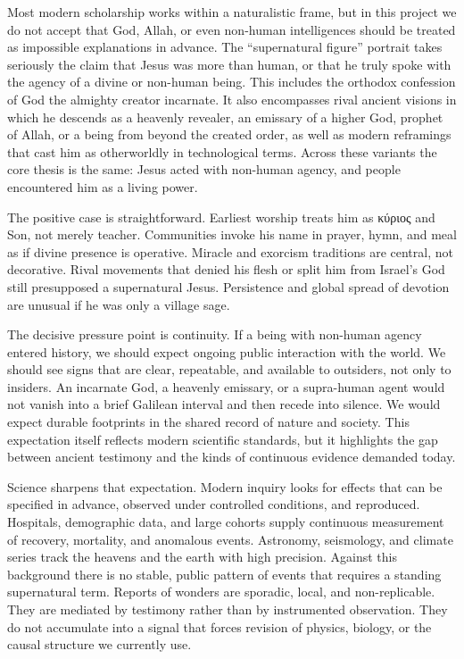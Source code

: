 Most modern scholarship works within a naturalistic frame, but in this project we do not accept that God, Allah, or even non-human intelligences should be treated as impossible explanations in advance.
The ``supernatural figure'' portrait takes seriously the claim that Jesus was more than human, or that he truly spoke with the agency of a divine or non-human being.
This includes the orthodox confession of God the almighty creator incarnate.
It also encompasses rival ancient visions in which he descends as a heavenly revealer, an emissary of a higher God, prophet of Allah, or a being from beyond the created order, as well as modern reframings that cast him as otherworldly in technological terms.
Across these variants the core thesis is the same: Jesus acted with non-human agency, and people encountered him as a living power.

The positive case is straightforward.
Earliest worship treats him as κύριος and Son, not merely teacher.
Communities invoke his name in prayer, hymn, and meal as if divine presence is operative.
Miracle and exorcism traditions are central, not decorative.
Rival movements that denied his flesh or split him from Israel’s God still presupposed a supernatural Jesus.
Persistence and global spread of devotion are unusual if he was only a village sage.

The decisive pressure point is continuity.
If a being with non-human agency entered history, we should expect ongoing public interaction with the world.
We should see signs that are clear, repeatable, and available to outsiders, not only to insiders.
An incarnate God, a heavenly emissary, or a supra-human agent would not vanish into a brief Galilean interval and then recede into silence.
We would expect durable footprints in the shared record of nature and society.
This expectation itself reflects modern scientific standards, but it highlights the gap between ancient testimony and the kinds of continuous evidence demanded today.

Science sharpens that expectation.
Modern inquiry looks for effects that can be specified in advance, observed under controlled conditions, and reproduced.
Hospitals, demographic data, and large cohorts supply continuous measurement of recovery, mortality, and anomalous events.
Astronomy, seismology, and climate series track the heavens and the earth with high precision.
Against this background there is no stable, public pattern of events that requires a standing supernatural term.
Reports of wonders are sporadic, local, and non-replicable.
They are mediated by testimony rather than by instrumented observation.
They do not accumulate into a signal that forces revision of physics, biology, or the causal structure we currently use.

